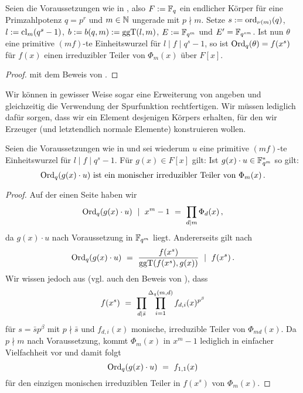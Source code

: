 \begin{lemma}
  \label{lemma:hoehere_wurzeln_auch_erzeuger_reg}
  Seien die Voraussetzungen wie in , also
  $F := \mathbb{F}_q$ ein endlicher Körper für eine Primzahlpotenz $q = p^r$ 
  und $m\in\mathbb{N}$ ungerade mit $p\nmid m$.
  Setze $s := \operatorname{ord}_{\nu(m)}(q)$, 
  $l := \operatorname{cl}_m(q^s-1)$, $b:= b(q,m) := \operatorname{ggT}(l,m)$, $E := \mathbb{F}_{q^m}$ und
  $E' = \mathbb{F}_{q^{sm}}$. 
  Ist nun $\theta$ eine primitive $(mf)$-te Einheitswurzel für 
  $l \mid f \mid q^s-1$, so ist $\operatorname{Ord}_q(\theta) = f(x^s)$ für 
  $f(x)$ einen irreduzibler Teiler von $\Phi_m(x)$ über $F[x]$.
\end{lemma}
\begin{proof}
   mit dem Beweis von
  .
\end{proof}


Wir können in gewisser Weise sogar eine Erweiterung von 
 angeben und
gleichzeitig die Verwendung der Spurfunktion rechtfertigen. 
Wir müssen lediglich dafür
sorgen, dass wir ein Element desjenigen Körpers erhalten, 
für den wir Erzeuger (und letztendlich normale Elemente) konstruieren wollen.

\begin{satz}
  \label{satz:q_ordnung_von_zusammensetzen}
  Seien die Voraussetzungen wie in  und 
  sei wiederum $u$ eine primitive $(mf)$-te Einheitswurzel für
  $l\mid f \mid q^s-1$.
  Für $g(x) \in F[x]$ gilt:
  Ist $g(x)\cdot u \in \mathbb{F}_{q^m}^\ast$ so gilt:
  \[ \operatorname{Ord}_q(g(x)\cdot u) \text{ ist ein monischer irreduzibler Teiler von }
    \Phi_m(x)\,. \]
\end{satz}
\begin{proof}
  Auf der einen Seite haben wir 
  \[ \operatorname{Ord}_q(g(x)\cdot u) \ \mid\  x^m-1 \ =\  \prod_{d\mid m} \Phi_d(x)\,, \]
  da $g(x)\cdot u$ nach Voraussetzung in $\mathbb{F}_{q^m}$ liegt.
  Andererseits gilt nach 
  \[ \operatorname{Ord}_q(g(x)\cdot u) \ =\  \frac{f(x^s)}{\operatorname{ggT}(f(x^s), g(x))} 
    \ \mid\  f(x^s) \,.\]
  Wir wissen jedoch aus  (vgl. auch den Beweis von
  ), dass 
  \[ f(x^s) \ =\  \prod_{d\mid \bar s} 
    \prod_{i=1}^{\Delta_q(m,d)} f_{d,i}(x)^{p^\beta}\]
  für $s = \bar sp^\beta$ mit $p\nmid \bar s$ und
  $f_{d,i}(x)$ monische, irreduzible Teiler von $\Phi_{md}(x)$. Da 
  $p\nmid m$ nach Voraussetzung, kommt $\Phi_m(x)$ in $x^m-1$ lediglich in
  einfacher Vielfachheit vor und damit folgt
  \[ \operatorname{Ord}_q(g(x)\cdot u) \ =\  f_{1,1}(x)\]
  für den einzigen monischen irreduziblen Teiler in $f(x^s)$ von $\Phi_m(x)$.
\end{proof}

